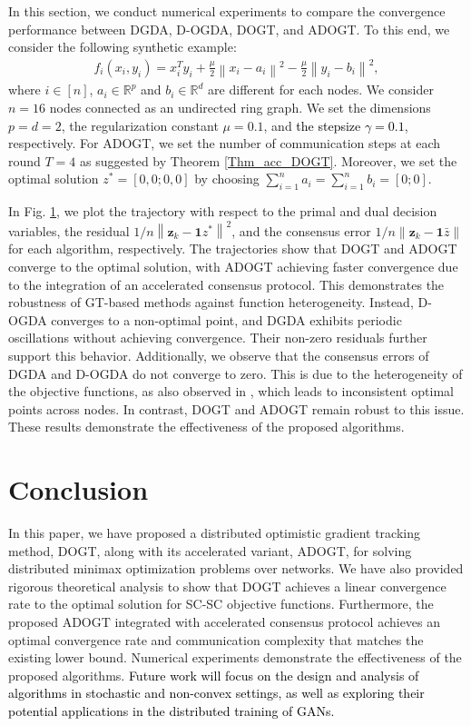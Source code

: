 \documentclass[10pt,a4paper]{amsart}
\def \hy #1{\textcolor{black}{#1}}
\begin{document}
In this section, we conduct numerical experiments to compare the convergence performance between DGDA, D-OGDA, DOGT, and ADOGT. To this end, we consider the following synthetic example:
\begin{equation}
\begin{aligned}
f_i\left( x_i,y_i \right) =x_{i}^{T}y_i+\frac{\mu}{2}\left\| x_i-a_i \right\| ^2-\frac{\mu}{2}\left\| y_i-b_i \right\| ^2,
\end{aligned}
\end{equation}
where $i\in[n]$, $a_i\in \mathbb{R} ^p$ and $b_i\in \mathbb{R} ^d$ are different for each nodes. We consider $n=16$ nodes connected as an undirected ring graph. We set the dimensions $p=d=2$, the regularization constant $\mu=0.1$, and \hy{the stepsize $\gamma =0.1$}, respectively. For ADOGT, we set the number of communication steps at each round $T=4$ as suggested by Theorem \ref{Thm_acc_DOGT}. Moreover, we set the optimal solution $z^*=\left[ 0, 0; 0, 0 \right]$ by choosing $\sum\nolimits_{i=1}^n{a_i}=\sum\nolimits_{i=1}^n{b_i}=[0;0]$.

In Fig. \href{https://arxiv.org/abs/2508.21431v1}{1}, we plot the trajectory with respect to the primal and dual decision variables, the residual $1/n\left\| \mathbf{z}_k-\mathbf{1}z^* \right\| ^2$, and the consensus error $1/n\left\| \mathbf{z}_k-\mathbf{1}\bar{z} \right\|$ for each algorithm, respectively. 
The trajectories show that DOGT and ADOGT converge to the optimal solution, with ADOGT achieving faster convergence due to the integration of an accelerated consensus protocol. This demonstrates the robustness of GT-based methods against function heterogeneity. Instead, D-OGDA converges to a non-optimal point, and DGDA exhibits periodic oscillations without achieving convergence. Their non-zero residuals further support this behavior. 
Additionally, we observe that the consensus errors of DGDA and D-OGDA do not converge to zero. This is due to the heterogeneity of the objective functions, as also observed in \cite{cai2024diffusion}, which leads to inconsistent optimal points across nodes. In contrast, DOGT and ADOGT remain robust to this issue. These results demonstrate the effectiveness of the proposed algorithms.


\section{Conclusion}\label{Sec_conclusion}
In this paper, we have proposed a distributed optimistic gradient tracking method, DOGT, along with its accelerated variant, ADOGT, for solving distributed minimax optimization problems over networks. We have also provided rigorous theoretical analysis to show that DOGT achieves a linear convergence rate to the optimal solution for SC-SC objective functions. Furthermore, the proposed ADOGT integrated with accelerated consensus protocol achieves an optimal convergence rate and communication complexity that matches the existing lower bound. Numerical experiments demonstrate the effectiveness of the proposed algorithms. \hy{Future work will focus on the design and analysis of algorithms in stochastic and non-convex settings, as well as exploring their potential applications in the distributed training of GANs.}
\end{document}
